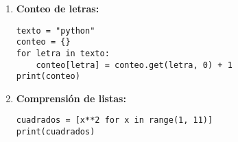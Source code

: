 \documentclass[12pt,a4paper]{article}
\begin{document}
\begin{enumerate}[label=\textbf{Ejercicio \arabic*:}, leftmargin=1.5cm]
    \item \textbf{Conteo de letras:}
    \begin{lstlisting}
texto = "python"
conteo = {}
for letra in texto:
    conteo[letra] = conteo.get(letra, 0) + 1
print(conteo)
    \end{lstlisting}

    \item \textbf{Comprensión de listas:}
    \begin{lstlisting}
cuadrados = [x**2 for x in range(1, 11)]
print(cuadrados)
    \end{lstlisting}
\end{enumerate}
\end{document}
